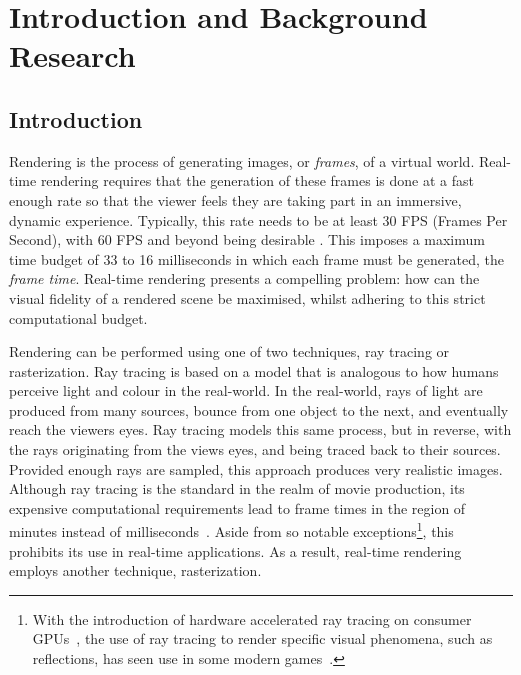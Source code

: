 \chapter{Introduction and Background Research}

\setlength{\parindent}{1em}
\setlength{\parskip}{0em}
\justifying

\label{chapter1}

\section{Introduction}

Rendering is the process of generating images, or \textit{frames}, of a virtual world. Real-time rendering requires that the generation of these frames is done at a fast enough rate so that the viewer feels they are taking part in an immersive, dynamic experience. Typically, this rate needs to be at least 30 FPS (Frames Per Second), with 60 FPS and beyond being desirable \cite{EffectsOfFrameRate}. This imposes a maximum time budget of 33 to 16 milliseconds in which each frame must be generated, the \textit{frame time}. Real-time rendering presents a compelling problem: how can the visual fidelity of a rendered scene be maximised, whilst adhering to this strict computational budget.

Rendering can be performed using one of two techniques, ray tracing or rasterization. Ray tracing is based on a model that is analogous to how humans perceive light and colour in the real-world. In the real-world, rays of light are produced from many sources, bounce from one object to the next, and eventually reach the viewers eyes. Ray tracing models this same process, but in reverse, with the rays originating from the views eyes, and being traced back to their sources. Provided enough rays are sampled, this approach produces very realistic images. Although ray tracing is the standard in the realm of movie production, its expensive computational requirements lead to frame times in the region of minutes instead of milliseconds~\cite{PixarCars}. Aside from so notable exceptions\footnote{With the introduction of hardware accelerated ray tracing on consumer GPUs~\cite{NvidiaTuringArchitecture}, the use of ray tracing to render specific visual phenomena, such as reflections, has seen use in some modern games~\cite{Battlefield5RayTracing}.}, this prohibits its use in real-time applications. As a result, real-time rendering employs another technique, rasterization.

